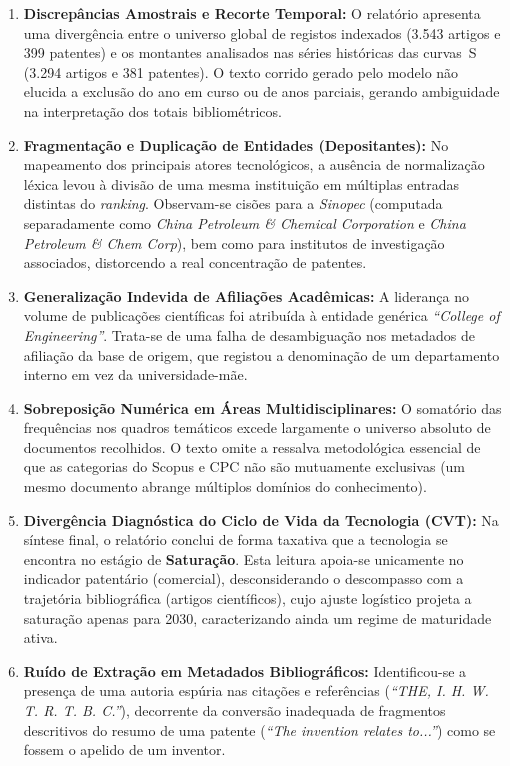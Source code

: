 \documentclass[12pt, a4paper]{article}
\begin{document}
  \begin{enumerate}[label=\alph*.]
    \item \textbf{Discrepâncias Amostrais e Recorte Temporal:} O relatório apresenta uma divergência entre o universo global de registos indexados (3.543 artigos e 399 patentes) e os montantes analisados nas séries históricas das curvas~S (3.294 artigos e 381 patentes). O texto corrido gerado pelo modelo não elucida a exclusão do ano em curso ou de anos parciais, gerando ambiguidade na interpretação dos totais bibliométricos.
    
    \item \textbf{Fragmentação e Duplicação de Entidades (Depositantes):} No mapeamento dos principais atores tecnológicos, a ausência de normalização léxica levou à divisão de uma mesma instituição em múltiplas entradas distintas do \textit{ranking}. Observam-se cisões para a \textit{Sinopec} (computada separadamente como \textit{China Petroleum \& Chemical Corporation} e \textit{China Petroleum \& Chem Corp}), bem como para institutos de investigação associados, distorcendo a real concentração de patentes.

    \item \textbf{Generalização Indevida de Afiliações Acadêmicas:} A liderança no volume de publicações científicas foi atribuída à entidade genérica \textit{``College of Engineering''}. Trata-se de uma falha de desambiguação nos metadados de afiliação da base de origem, que registou a denominação de um departamento interno em vez da universidade-mãe.

    \item \textbf{Sobreposição Numérica em Áreas Multidisciplinares:} O somatório das frequências nos quadros temáticos excede largamente o universo absoluto de documentos recolhidos. O texto omite a ressalva metodológica essencial de que as categorias do Scopus e CPC não são mutuamente exclusivas (um mesmo documento abrange múltiplos domínios do conhecimento).

    \item \textbf{Divergência Diagnóstica do Ciclo de Vida da Tecnologia (CVT):} Na síntese final, o relatório conclui de forma taxativa que a tecnologia se encontra no estágio de \textbf{Saturação}. Esta leitura apoia-se unicamente no indicador patentário (comercial), desconsiderando o descompasso com a trajetória bibliográfica (artigos científicos), cujo ajuste logístico projeta a saturação apenas para 2030, caracterizando ainda um regime de maturidade ativa.

    \item \textbf{Ruído de Extração em Metadados Bibliográficos:} Identificou-se a presença de uma autoria espúria nas citações e referências (\textit{``THE, I. H. W. T. R. T. B. C.''}), decorrente da conversão inadequada de fragmentos descritivos do resumo de uma patente (\textit{``The invention relates to...''}) como se fossem o apelido de um inventor.
  \end{enumerate}
\end{document}
